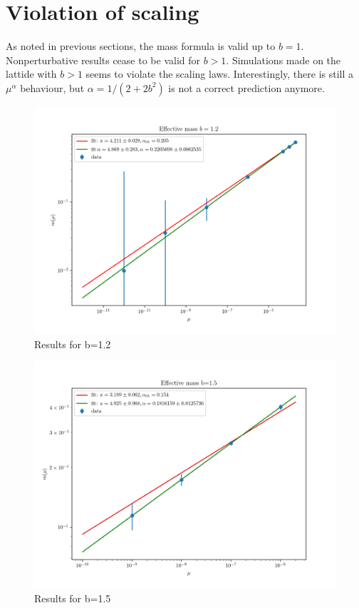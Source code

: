 \documentclass[12pt,a4paper]{report}
\begin{document}
 

 
 \section{Violation of scaling}
 
As noted in previous sections, the mass formula is valid up to $b=1$. Nonperturbative results  cease to be valid for $b>1$. Simulations made on the lattide with $b>1$ seems to violate the scaling laws. Interestingly, there is still a $\mu^\alpha$ behaviour, but $\alpha= 1/(2+2b^2)$ is not a correct prediction anymore.


\begin{figure}
\centering
\includegraphics[width=1.0\textwidth]{b1_2}
\caption{Results for b=1.2}
\label{fig:mass_scaling_b1.2}
\end{figure}
 
\begin{figure}
\centering
\includegraphics[width=1.0\textwidth]{b1_5}
\caption{Results for b=1.5}
\label{fig:mass_scaling_b1.5}
\end{figure}
\end{document}
